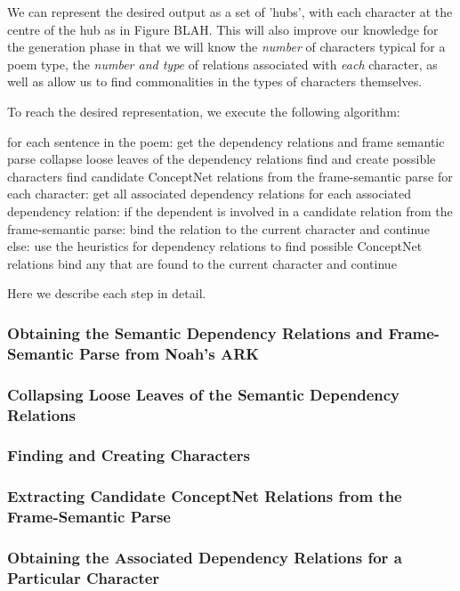 We can represent the desired output as a set of 'hubs', with each character at the centre of the hub as in Figure BLAH. This will also improve our knowledge for the generation phase in that we will know the \textit{number} of characters typical for a poem type, the \textit{number and type} of relations associated with \textit{each} character, as well as allow us to find commonalities in the types of characters themselves.

To reach the desired representation, we execute the following algorithm:

for each sentence in the poem:
	get the dependency relations and frame semantic parse
	collapse loose leaves of the dependency relations
	find and create possible characters
	find candidate ConceptNet relations from the frame-semantic parse
	for each character:
		get all associated dependency relations
		for each associated dependency relation:
			if the dependent is involved in a candidate relation from the frame-semantic parse:
				bind the relation to the current character and continue
			else:
				use the heuristics for dependency relations to find possible ConceptNet relations
				bind any that are found to the current character and continue
				
Here we describe each step in detail.

\subsubsection{Obtaining the Semantic Dependency Relations and Frame-Semantic Parse from Noah's ARK}

\subsubsection{Collapsing Loose Leaves of the Semantic Dependency Relations}

\subsubsection{Finding and Creating Characters}

\subsubsection{Extracting Candidate ConceptNet Relations from the Frame-Semantic Parse}

\subsubsection{Obtaining the Associated Dependency Relations for a Particular Character}

